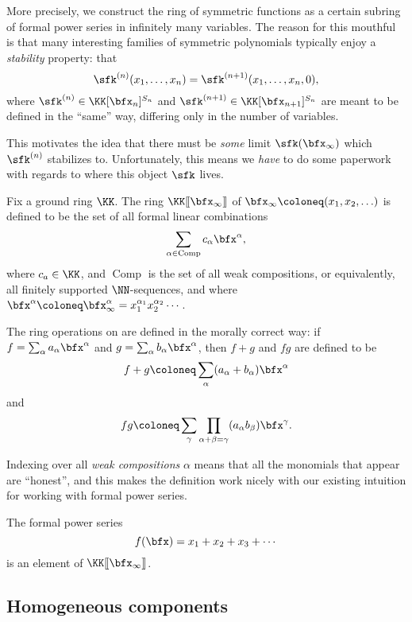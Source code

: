 \documentclass{article}
\newcommand{\fps}[2]{#1 [\kern-1.2pt[ {#2} ]\kern-1.2pt]}
\newcommand{\pring}[2]{#1 [ {#2} ]}
\DeclareMathOperator{\Com}{Comp}
\begin{document}
More precisely, we construct the ring of symmetric functions as a certain subring of formal power series in infinitely many variables.
The reason for this mouthful is that many interesting families of symmetric polynomials typically enjoy a \textit{stability} property: that
\[
    \sfk^{(n)}(x_1,\ldots,x_n)
    =
    \sfk^{(n+1)}(x_1,\ldots,x_n, 0),
\]
where $\sfk^{(n)} \in \pring{\KK}{\bfx_n}^{S_n}$ and $\sfk^{(n+1)} \in \pring{\KK}{\bfx_{n+1}}^{S_n}$ are meant to be defined in the ``same'' way, differing only in the number of variables.

This motivates the idea that there must be \textit{some} limit $\sfk(\bfx_\infty)$ which $\sfk^{(n)}$ stabilizes to.
Unfortunately, this means we \textit{have} to do some paperwork with regards to where this object $\sfk$ lives.

\begin{definition}
    Fix a ground ring $\KK$.
    The ring $\fps{\KK}{\bfx_\infty}$ of  $\bfx_\infty \coloneq (x_1, x_2, \ldots)$ is defined to be the set of all formal linear combinations 
    \[
        \sum_{\alpha\in\Com} c_\alpha \bfx^\alpha,
    \]
    where $c_a \in \KK$, and $\Com$ is the set of all weak compositions, or equivalently, all finitely supported $\NN$-sequences, and where $\bfx^\alpha \coloneq \bfx_\infty^\alpha = x_1^{\alpha_1}x_2^{\alpha_2}\cdots$.

    The ring operations on are defined in the morally correct way:
    if $f = \sum_\alpha a_\alpha \bfx^\alpha$ and $g = \sum_\alpha b_\alpha \bfx^\alpha$, then $f + g$ and $fg$ are defined to be
    \[
        f+g
        \coloneq
        \sum_\alpha
        (a_\alpha+b_\alpha)\bfx^\alpha
    \]
    and
    \[
        fg
        \coloneq
        \sum_\gamma \prod_{\alpha+\beta=\gamma}
        (a_\alpha b_\beta) \bfx^\gamma.
    \]
\end{definition}

Indexing over all \textit{weak compositions} $\alpha$ means that all the monomials that appear are ``honest'', and this makes the definition work nicely with our existing intuition for working with formal power series.

\begin{example}
    The formal power series
    \[
        f(\bfx)
        =
        x_1 + x_2 + x_3 + \cdots
    \]
    is an element of $\fps{\KK}{\bfx_\infty}$.
\end{example}

\subsection{Homogeneous components}
\end{document}
